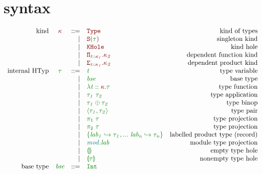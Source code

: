 \documentclass[12pt,fleqn]{article}
\newcommand{\red}[1]{\textcolor{red}{#1}}
\newcommand{\green}[1]{\textcolor{green}{#1}}
\newcommand{\teal}[1]{\textcolor{teal}{#1}}
\newcommand{\redtt}[1]{\red{\mathtt{#1}}}
\newcommand{\greentt}[1]{\green{\mathtt{#1}}}
\newcommand{\redit}[1]{\red{\mathit{#1}}}
\newcommand{\greenit}[1]{\green{\mathit{#1}}}
\newcommand{\tealit}[1]{\teal{\mathit{#1}}}
\newcommand{\knd}[1][]{\redit{\kappa#1}}
\newcommand{\typ}[1][]{\greenit{\tau#1}}
\newcommand{\typvar}[1][]{\greenit{t#1}}
\renewcommand{\mod}[1][]{\tealit{mod#1}}
\newcommand{\lab}[1][]{\mathit{lab#1}}
\newcommand{\Type}{\redtt{Type}}
\newcommand{\SKind}[1]{\redtt{S(#1)}}
\newcommand{\KHole}{\redtt{KHole}}
\newcommand{\DepFunKind}[2]{\redtt{\Pi_{#1}.{#2}}}
\newcommand{\DepProdKind}[2]{\redtt{\Sigma_{#1}.{#2}}}
\newcommand{\TypCFun}[2]{\greentt{\lambda #1.#2}}
\newcommand{\TypCAp}[2]{\greentt{#1~#2}}
\newcommand{\TypCPair}[2]{\greentt{\langle #1, #2\rangle}}
\newcommand{\TypCPairPrjL}[1]{\greentt{\pi_1~#1}}
\newcommand{\TypCPairPrjR}[1]{\greentt{\pi_2~#1}}
\newcommand{\TypCHole}[1]{\greentt{\llparenthesis #1 \rrparenthesis}}
\newcommand{\Int}{\greentt{Int}}
\begin{document}
\section{syntax}
\[\begin{array}{rcrlr}
    \textrm{kind} & \knd & ::=
                  & \Type & \textrm{kind of types} \\
                  && \vert & \SKind{\typ} & \textrm{singleton kind} \\
                  && \vert & \KHole & \textrm{kind hole} \\
                  && \vert & \DepFunKind{\typvar::\knd[_1]}{\knd[_2]} & \textrm{dependent function kind} \\
                  && \vert & \DepProdKind{\typvar::\knd[_1]}{\knd[_2]} & \textrm{dependent product kind} \\
    \textrm{internal HTyp} & \typ & ::=
                           & \typvar & \textrm{type variable} \\
                           && \vert & \greenit{bse} & \textrm{base type} \\
                           && \vert & \TypCFun{\typvar::\knd}{\typ} & \textrm{type function} \\
                           && \vert & \TypCAp{\typ[_1]}{\typ[_2]} & \textrm{type application} \\
                           && \vert & \greentt{\typ[_1] \oplus \typ[_2]} & \textrm{type binop} \\
                           && \vert & \TypCPair{\typ[_1]}{\typ[_2]} & \textrm{type pair} \\
                           && \vert & \TypCPairPrjL{\typ} & \textrm{type projection} \\
                           && \vert & \TypCPairPrjR{\typ} & \textrm{type projection} \\
                           && \vert & \greentt{\{\lab[_1] \hookrightarrow \typ[_1], ...~\lab[_n] \hookrightarrow \typ[_n]\}} & \textrm{labelled product type (record)} \\
                           && \vert & \greentt{\mod.\lab} & \textrm{module type projection} \\
                           && \vert & \TypCHole{} & \textrm{empty type hole} \\
                           && \vert & \TypCHole{\typ} & \textrm{nonempty type hole} \\
    \textrm{base type} & \greenit{bse} & ::=
                       & \Int \\

\end{array}\]
\end{document}
